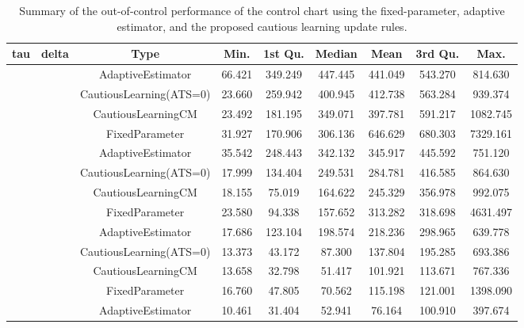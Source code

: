 \begin{table}[!h]

\caption{Summary of the out-of-control performance of the control chart using the fixed-parameter, adaptive estimator, and the proposed cautious learning update rules.}
\centering
\begin{tabular}[t]{ccccccccc}
\toprule
tau & delta & Type & Min. & 1st Qu. & Median & Mean & 3rd Qu. & Max.\\
\midrule
 &  & AdaptiveEstimator & 66.421 & 349.249 & 447.445 & 441.049 & 543.270 & 814.630\\

 &  & CautiousLearning(ATS=0) & 23.660 & 259.942 & 400.945 & 412.738 & 563.284 & 939.374\\

 &  & CautiousLearningCM & 23.492 & 181.195 & 349.071 & 397.781 & 591.217 & 1082.745\\

 & \multirow[t]{-4}{*}{\centering\arraybackslash 0.25} & FixedParameter & 31.927 & 170.906 & 306.136 & 646.629 & 680.303 & 7329.161\\
\cmidrule{2-9}
 &  & AdaptiveEstimator & 35.542 & 248.443 & 342.132 & 345.917 & 445.592 & 751.120\\

 &  & CautiousLearning(ATS=0) & 17.999 & 134.404 & 249.531 & 284.781 & 416.585 & 864.630\\

 &  & CautiousLearningCM & 18.155 & 75.019 & 164.622 & 245.329 & 356.978 & 992.075\\

 & \multirow[t]{-4}{*}{\centering\arraybackslash 0.35} & FixedParameter & 23.580 & 94.338 & 157.652 & 313.282 & 318.698 & 4631.497\\
\cmidrule{2-9}
 &  & AdaptiveEstimator & 17.686 & 123.104 & 198.574 & 218.236 & 298.965 & 639.778\\

 &  & CautiousLearning(ATS=0) & 13.373 & 43.172 & 87.300 & 137.804 & 195.285 & 693.386\\

 &  & CautiousLearningCM & 13.658 & 32.798 & 51.417 & 101.921 & 113.671 & 767.336\\

 & \multirow[t]{-4}{*}{\centering\arraybackslash 0.50} & FixedParameter & 16.760 & 47.805 & 70.562 & 115.198 & 121.001 & 1398.090\\
\cmidrule{2-9}
 &  & AdaptiveEstimator & 10.461 & 31.404 & 52.941 & 76.164 & 100.910 & 397.674\\


\end{tabular}
\end{table}
